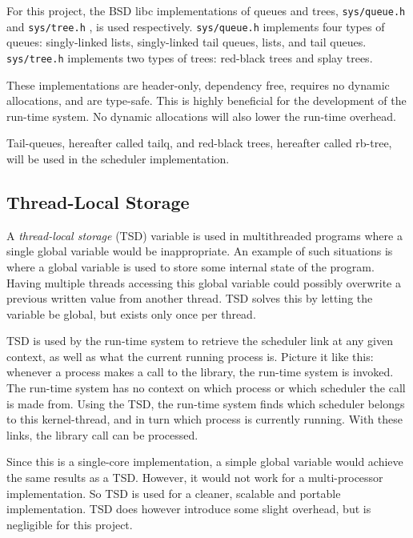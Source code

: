For this project, the BSD libc implementations of queues and trees, \texttt{sys/queue.h} \citep{manqueue} and \texttt{sys/tree.h} \citep{mantree}, is used respectively. \texttt{sys/queue.h} implements four types of queues: singly\hyp{}linked lists, singly\hyp{}linked tail queues, lists, and tail queues. \texttt{sys/tree.h} implements two types of trees: red\hyp{}black trees and splay trees. 

These implementations are header\hyp{}only, dependency free, requires no dynamic allocations, and are type\hyp{}safe. This is highly beneficial for the development of the run\hyp{}time system. No dynamic allocations will also lower the run\hyp{}time overhead. 

Tail\hyp{}queues, hereafter called tailq, and red\hyp{}black trees, hereafter called rb\hyp{}tree, will be used in the scheduler implementation. 


\subsection{Thread\hyp{}Local Storage}
\label{subsec:thread-local_storage}

A \textit{thread\hyp{}local storage} (TSD) variable is used in multithreaded programs where a single global variable would be inappropriate. An example of such situations is where a global variable is used to store some internal state of the program. Having multiple threads accessing this global variable could possibly overwrite a previous written value from another thread. TSD solves this by letting the variable be global, but exists only once per thread. 

TSD is used by the run\hyp{}time system to retrieve the scheduler link at any given context, as well as what the current running process is. Picture it like this: whenever a process makes a call to the library, the run\hyp{}time system is invoked. The run\hyp{}time system has no context on which process or which scheduler the call is made from. Using the TSD, the run\hyp{}time system finds which scheduler belongs to this kernel\hyp{}thread, and in turn which process is currently running. With these links, the library call can be processed. 

Since this is a single\hyp{}core implementation, a simple global variable would achieve the same results as a TSD. However, it would not work for a multi\hyp{}processor implementation. So TSD is used for a cleaner, scalable and portable implementation. TSD does however introduce some slight overhead, but is negligible for this project.

